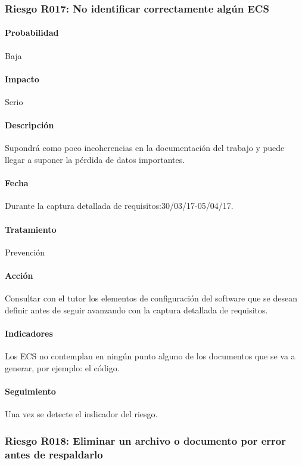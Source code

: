 \documentclass[10pt,a4paper]{article}
\begin{document}
			\subsubsection{Riesgo R017: No identificar correctamente algún ECS }
				\paragraph{Probabilidad} Baja
				\paragraph{Impacto}	Serio
				\paragraph{Descripción} Supondrá como poco incoherencias en la documentación del trabajo y puede llegar a suponer la pérdida de datos importantes.
				\paragraph{Fecha} Durante la captura detallada de requisitos:30/03/17-05/04/17. %
				\paragraph{Tratamiento} Prevención %
				\paragraph{Acción} Consultar con el tutor los elementos de configuración del software que se desean definir antes de seguir avanzando con la captura detallada de requisitos.%
				\paragraph{Indicadores} Los ECS no contemplan en ningún punto alguno de los documentos que se va a generar, por ejemplo: el código. %
				\paragraph{Seguimiento}	Una vez se detecte el indicador del riesgo.  %
			
			\subsubsection{Riesgo R018: Eliminar un archivo o documento por error antes de respaldarlo}
\end{document}

